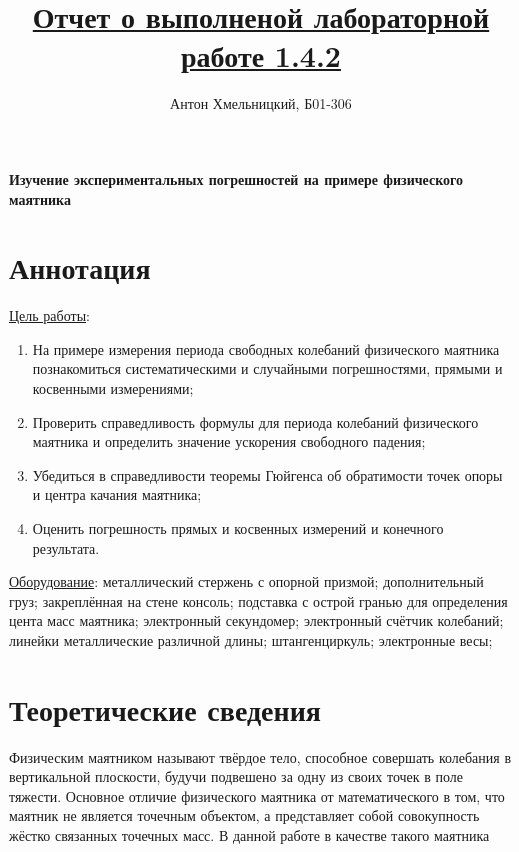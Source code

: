 \documentclass[a4paper]{article}
\title{\underline{Отчет о выполненой лабораторной работе 1.4.2}}
\author{Антон Хмельницкий, Б01-306}
\begin{document}
\maketitle
\textbf{Изучение экспериментальных погрешностей на примере физического маятника}

\section{Аннотация}
\underline{Цель работы}: 
\begin{enumerate}
    \item На примере измерения периода свободных колебаний физического маятника познакомиться систематическими и случайными погрешностями, прямыми и косвенными измерениями; 
    \item Проверить справедливость формулы для периода колебаний физического маятника и определить значение ускорения свободного падения; 
    \item Убедиться в справедливости теоремы Гюйгенса об обратимости точек опоры и центра качания маятника; 
    \item Оценить погрешность прямых и косвенных измерений и конечного результата.
\end{enumerate} \par
\underline{Оборудование}: металлический стержень с опорной призмой; дополнительный груз; закреплённая на стене консоль; подставка с острой гранью для определения цента масс маятника; электронный секундомер; электронный счётчик колебаний; линейки металлические различной длины; штангенциркуль; электронные весы;

\section{Теоретические сведения}

Физическим маятником называют твёрдое тело, способное совершать колебания в вертикальной плоскости, будучи подвешено за одну из своих точек в поле тяжести. Основное отличие физического маятника от математического в том, что маятник не является точечным объектом, а представляет собой совокупность жёстко связанных точечных масс. В данной работе в качестве такого маятника
\end{document}
